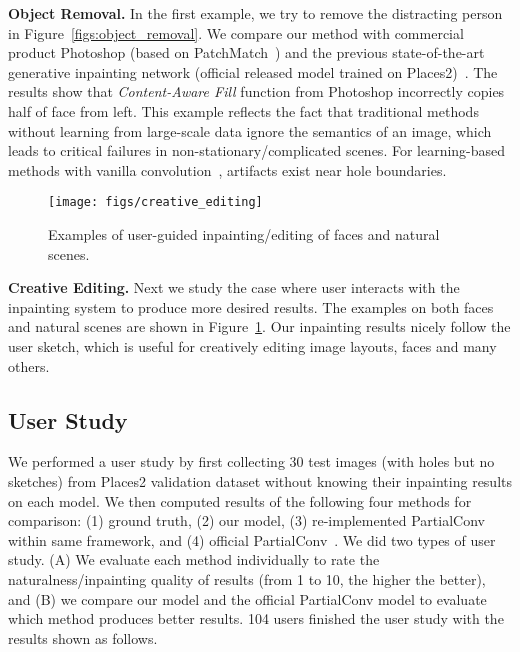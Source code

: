 \documentclass[10pt,twocolumn,letterpaper]{article}
\begin{document}
\textbf{Object Removal.}
In the first example, we try to remove the distracting person in Figure~\ref{figs:object_removal}.
We compare our method with commercial product Photoshop (based on PatchMatch~\cite{barnes2009patchmatch}) and the previous state-of-the-art generative inpainting network (official released model trained on Places2)~\cite{yu2018generative}.
The results show that \textit{Content-Aware Fill} function from Photoshop incorrectly copies half of face from left.
This example reflects the fact that traditional methods without learning from large-scale data ignore the semantics of an image, which leads to critical failures in non-stationary/complicated scenes.
For learning-based methods with vanilla convolution~\cite{yu2018generative}, artifacts exist near hole boundaries.

\begin{figure}[t]
  \centering
  \texttt{[image: figs/creative\_editing]}
  \vspace{-8mm}
  \caption{Examples of user-guided inpainting/editing of faces and natural scenes.}
  \label{figs:creative_editing}
  \vspace{-2mm}
\end{figure}

\textbf{Creative Editing.}
Next we study the case where user interacts with the inpainting system to produce more desired results. The examples on both faces and natural scenes are shown in Figure~\ref{figs:creative_editing}. Our inpainting results nicely follow the user sketch, which is useful for creatively editing image layouts, faces and many others.

\subsection{User Study}
We performed a user study by first collecting 30 test images (with holes but no sketches) from Places2 validation dataset without knowing their inpainting results on each model.
We then computed results of the following four methods for comparison: (1) ground truth, (2) our model, (3) re-implemented PartialConv~\cite{liu2018image} within same framework, and (4) official PartialConv~\cite{liu2018image}.
We did two types of user study.
(A) We evaluate each method individually to rate the naturalness/inpainting quality of results (from 1 to 10, the higher the better), and (B) we compare our model and the official PartialConv model to evaluate which method produces better results.
104 users finished the user study with the results shown as follows.
\end{document}
